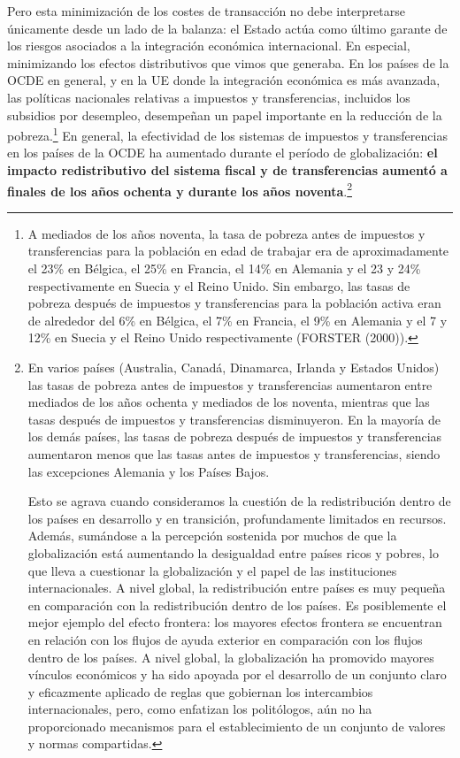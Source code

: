 \documentclass[10pt,a4paper]{article}
\begin{document}
Pero esta minimización de los costes de transacción no debe interpretarse únicamente desde un lado de la balanza: el Estado actúa como último garante de los riesgos asociados a la integración económica internacional. En especial, minimizando los efectos distributivos que vimos que generaba. En los países de la OCDE en general, y en la UE donde la integración económica es más avanzada, las políticas nacionales relativas a impuestos y transferencias, incluidos los subsidios por desempleo, desempeñan un papel importante en la reducción de la pobreza.\footnote{%
    A mediados de los años noventa, la tasa de pobreza antes de impuestos y transferencias para la población en edad de trabajar era de aproximadamente el 23\% en Bélgica, el 25\% en Francia, el 14\% en Alemania y el 23 y 24\% respectivamente en Suecia y el Reino Unido. Sin embargo, las tasas de pobreza después de impuestos y transferencias para la población activa eran de alrededor del 6\% en Bélgica, el 7\% en Francia, el 9\% en Alemania y el 7 y 12\% en Suecia y el Reino Unido respectivamente (FORSTER (2000)).
} En general, la efectividad de los sistemas de impuestos y transferencias en los países de la OCDE ha aumentado durante el período de globalización: \textbf{el impacto redistributivo del sistema fiscal y de transferencias aumentó a finales de los años ochenta y durante los años noventa}.\footnote{%
    En varios países (Australia, Canadá, Dinamarca, Irlanda y Estados Unidos) las tasas de pobreza antes de impuestos y transferencias aumentaron entre mediados de los años ochenta y mediados de los noventa, mientras que las tasas después de impuestos y transferencias disminuyeron. En la mayoría de los demás países, las tasas de pobreza después de impuestos y transferencias aumentaron menos que las tasas antes de impuestos y transferencias, siendo las excepciones Alemania y los Países Bajos. 

Esto se agrava cuando consideramos la cuestión de la redistribución dentro de los países en desarrollo y en transición, profundamente limitados en recursos. Además, sumándose a la percepción sostenida por muchos de que la globalización está aumentando la desigualdad entre países ricos y pobres, lo que lleva a cuestionar la globalización y el papel de las instituciones internacionales. A nivel global, la redistribución entre países es muy pequeña en comparación con la redistribución dentro de los países. Es posiblemente el mejor ejemplo del efecto frontera: los mayores efectos frontera se encuentran en relación con los flujos de ayuda exterior en comparación con los flujos dentro de los países. A nivel global, la globalización ha promovido mayores vínculos económicos y ha sido apoyada por el desarrollo de un conjunto claro y eficazmente aplicado de reglas que gobiernan los intercambios internacionales, pero, como enfatizan los politólogos, aún no ha proporcionado mecanismos para el establecimiento de un conjunto de valores y normas compartidas.
}
\end{document}
